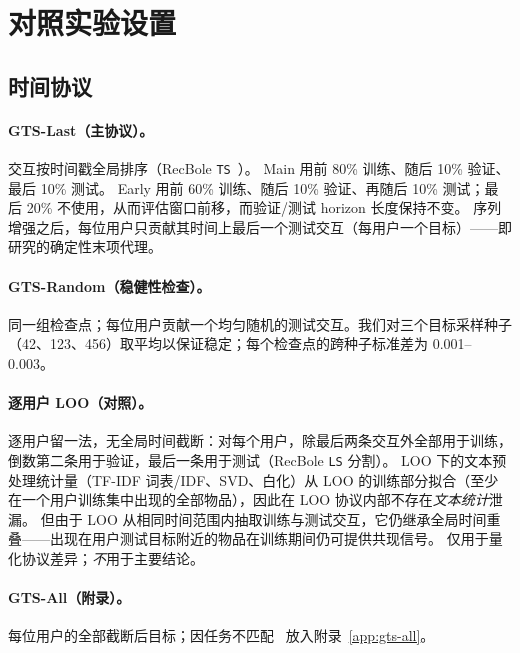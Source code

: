\documentclass[sigconf,natbib=true,anonymous]{acmart}
\newcommand{\tfidf}{\textsc{TF-IDF}\xspace}
\begin{document}
\section{对照实验设置}
\label{sec:setup}

\subsection{时间协议}
\label{sec:protocol}

\paragraph{GTS-Last（主协议）。}
交互按时间戳全局排序（RecBole \texttt{TS}~\cite{zhao2021recbole}）。
Main 用前 80\% 训练、随后 10\% 验证、最后 10\% 测试。
Early 用前 60\% 训练、随后 10\% 验证、再随后 10\% 测试；最后 20\% 不使用，从而评估窗口前移，而验证/测试 horizon 长度保持不变。
序列增强之后，每位用户只贡献其时间上最后一个测试交互（每用户一个目标）——即 \citet{gusak2025time} 研究的确定性末项代理。

\paragraph{GTS-Random（稳健性检查）。}
同一组检查点；每位用户贡献一个均匀随机的测试交互。我们对三个目标采样种子（42、123、456）取平均以保证稳定；每个检查点的跨种子标准差为 0.001--0.003。

\paragraph{逐用户 LOO（对照）。}
逐用户留一法，无全局时间截断：对每个用户，除最后两条交互外全部用于训练，倒数第二条用于验证，最后一条用于测试（RecBole \texttt{LS} 分割）。
LOO 下的文本预处理统计量（\tfidf 词表/IDF、SVD、白化）从 LOO 的训练部分拟合（至少在一个用户训练集中出现的全部物品），因此在 LOO 协议内部不存在\emph{文本统计}泄漏。
但由于 LOO 从相同时间范围内抽取训练与测试交互，它仍继承全局时间重叠——出现在用户测试目标附近的物品在训练期间仍可提供共现信号。
仅用于量化协议差异；\emph{不}用于主要结论。

\paragraph{GTS-All（附录）。}
每位用户的全部截断后目标；因任务不匹配~\cite{gusak2025time} 放入附录~\ref{app:gts-all}。
\end{document}
